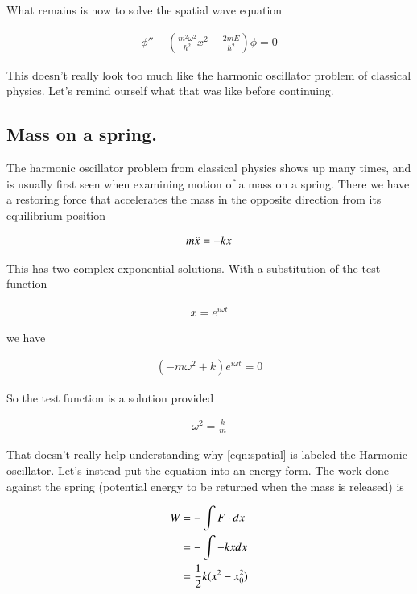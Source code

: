 \documentclass{article}
\begin{document}
What remains is now to solve the spatial wave equation

\begin{align}\label{eqn:spatial}
\phi'' - \left( \frac{m^2 \omega^2}{\hbar^2} x^2 - \frac{2m E}{\hbar^2}\right) \phi = 0
\end{align}

This doesn't really look too much like the harmonic oscillator problem of classical physics.  Let's remind ourself
what that was like before continuing.

\subsection{Mass on a spring. }

The harmonic oscillator problem from classical physics
shows up many times, and is usually first seen when examining motion
of a mass on a spring.  There we have a restoring force that accelerates the
mass in the opposite direction from its equilibrium position

\begin{align}
m \ddot{x} = -k x
\end{align}

This has two complex exponential solutions.  With a substitution of the test function

\begin{align*}
x = e^{i \omega t}
\end{align*}

we have

\begin{align*}
(-m \omega^2 + k) e^{i \omega t} = 0
\end{align*}

So the test function is a solution provided

\begin{align*}
\omega^2 = \frac{k}{m}
\end{align*}

That doesn't really help understanding why \ref{eqn:spatial} is labeled the Harmonic oscillator.  Let's instead put the equation into an energy form.  The work done against the spring
(potential energy to be returned when the mass is released) is

\begin{align*}
W 
&= - \int F \cdot dx \\
&= - \int -kx dx \\
&= \frac{1}{2} k (x^2 - x_0^2)
\end{align*}
\end{document}
